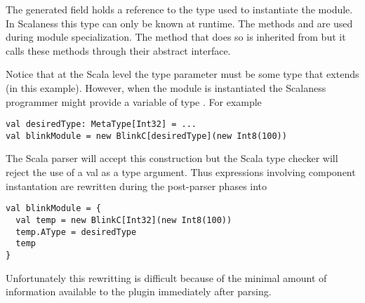 The generated field  holds a reference to the type used to instantiate the
module. In Scalaness this type can only be known at runtime. The methods 
and  are used during module specialization. The method that does so is
inherited from  but it calls these methods through their abstract
interface.

Notice that at the Scala level the type parameter must be some type that extends
 (in this example). However, when the module is instantiated the
Scalaness programmer might provide a variable of type . For example

\singlespace
\begin{lstlisting}
val desiredType: MetaType[Int32] = ...
val blinkModule = new BlinkC[desiredType](new Int8(100))
\end{lstlisting}
\primaryspacing

The Scala parser will accept this construction but the Scala type checker will reject the use of
a val as a type argument. Thus expressions involving component instantation are rewritten during
the post-parser phases into

\singlespace
\begin{lstlisting}
val blinkModule = {
  val temp = new BlinkC[Int32](new Int8(100))
  temp.AType = desiredType
  temp
}
\end{lstlisting}
\primaryspacing

Unfortunately this rewritting is difficult because of the minimal amount of information
available to the plugin immediately after parsing.


